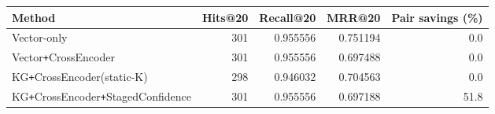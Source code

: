 \begin{tabular}{lrrrr}
\toprule
Method & Hits@20 & Recall@20 & MRR@20 & Pair savings (\%) \\
\midrule
Vector-only & 301 & 0.955556 & 0.751194 & 0.0 \\
Vector\texttt{+}CrossEncoder & 301 & 0.955556 & 0.697488 & 0.0 \\
KG\texttt{+}CrossEncoder(static-K) & 298 & 0.946032 & 0.704563 & 0.0 \\
KG\texttt{+}CrossEncoder\texttt{+}StagedConfidence & 301 & 0.955556 & 0.697188 & 51.8 \\
\bottomrule
\end{tabular}
